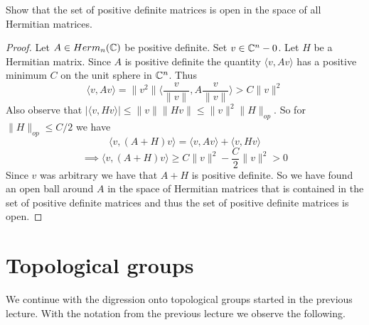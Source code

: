 \documentclass{article}
\begin{document}
\begin{exercise*}
    Show that the set of positive definite matrices is open in the space of all Hermitian matrices.
\end{exercise*}
\begin{proof}
    Let $A\in Herm_n(\mathbb C)$ be positive definite. Set $v\in \mathbb C^n-0$. Let $H$ be a Hermitian matrix.     
    Since $A$ is positive definite the quantity $\langle v,Av \rangle$ has a positive minimum $C$ on the unit sphere in $\mathbb C^n$. Thus $$\langle v,Av\rangle = \|v^2\|\langle \frac{v}{\|v\|},A\frac{v}{\|v\|}\rangle > C\|v\|^2$$
    Also observe that $|\langle v,Hv \rangle|\leq \|v\|\|Hv\|\leq \|v\|^2\|H\|_{op}$. So for $\|H\|_{op}\leq C/2$ we have 
    $$\langle v,(A+H)v \rangle = \langle v,Av \rangle + \langle v,Hv\rangle$$
    $$\implies \langle v,(A+H)v \rangle \geq C\|v\|^2-\frac{C}{2}\|v\|^2>0$$
    Since $v$ was arbitrary we have that $A+H$ is positive definite. So we have found an open ball around $A$ in the space of Hermitian matrices that is contained in the set of positive definite matrices and thus the set of positive definite matrices is open.
\end{proof}

\section*{Topological groups}

We continue with the digression onto topological groups started in the previous lecture. With the notation from the previous lecture we observe the following.
\end{document}

